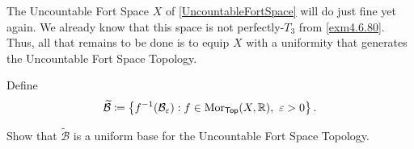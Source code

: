 \begin{exm}
The Uncountable Fort Space $X$ of \cref{UncountableFortSpace} will do just fine yet again.  We already know that this space is not perfectly-$T_3$ from \cref{exm4.6.80}.  Thus, all that remains to be done is to equip $X$ with a uniformity that generates the Uncountable Fort Space Topology.

Define
\begin{equation}
\widetilde{\mathcal{B}}\coloneqq \left\{ f^{-1}(\mathcal{B}_{\varepsilon}):f\in \Mor _{\Top}(X,\R ),\ \varepsilon >0\right\} .
\end{equation}
\begin{exr}
Show that $\widetilde{\mathcal{B}}$ is a uniform base for the Uncountable Fort Space Topology.
\end{exr}
\end{exm}
